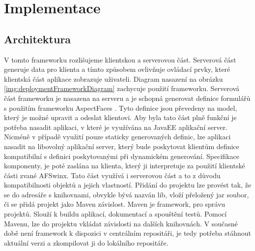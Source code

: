 \chapter{Implementace} 
\section{Architektura}
V tomto frameworku \cite{framework} rozlišujeme klientskou a serverovou část. Serverová část generuje data pro klienta a tímto způsobem ovlivňuje ovládací prvky, které klientská část aplikace zobrazuje uživateli. Diagram nasazení na obrázku \ref{img:deploymentFrameworkDiagram} zachycuje použití frameworku. Serverová část frameworku je nasazena na serveru a je schopná generovat definice formulářů s použitím frameworku AspectFaces \cite{aspectFaces}. Tyto definice jsou převedeny na model, který je možné upravit a odeslat klientovi. Aby byla tato část plně funkční je potřeba nasadit aplikaci, v které je využívána na JavaEE aplikační server. Nicméně v případě využití pouze staticky generovaných definic, lze aplikaci nasadit na libovolný aplikační server, který bude poskytovat klientům definice kompatibilní s definici poskytovanými při dynamickém generování. Specifikace komponenty, je poté zaslána na klienta, který ji interpretuje za použití klientské části zvané AFSwinx. Tato část využívá i serverovou část a to z důvodu kompatibilnosti objektů a jejich vlastností. Přidání do projektu lze provést tak, že se do adresáře s knihovnami, obvykle bývá nazván lib, vloží přeložený jar soubor, či se přidá projekt jako Maven závislost. Maven \cite{maven} je framework, pro správu projektů. Slouží k buildu aplikací, dokumentací a spouštění testů. Pomocí Mavenu, lze do projektu vkládat závislosti na dalších knihovnách. V současné době není framework k dispozici v centrálním repositáři, je tedy potřeba stáhnout aktuální verzi a zkompilovat ji do lokálního repositáře. 
